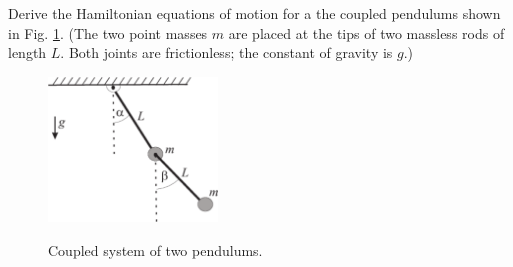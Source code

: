 \begin{exercise}
	Derive the Hamiltonian equations of motion for a the coupled pendulums shown in Fig. \ref{fig:ex81coupled_pendula}. (The two point masses $m$ are placed at the tips of two massless rods of length $L$. Both joints are frictionless; the constant of gravity is $g$.)
\begin{figure}[h]
\begin{centering}
	\includegraphics[width=0.4\textwidth]{figures/ch8/Series/coupledpendula.pdf}
	\label{fig:ex81coupled_pendula}
	\caption{Coupled system of two pendulums.}
\par\end{centering}
\end{figure}
	
\end{exercise}

